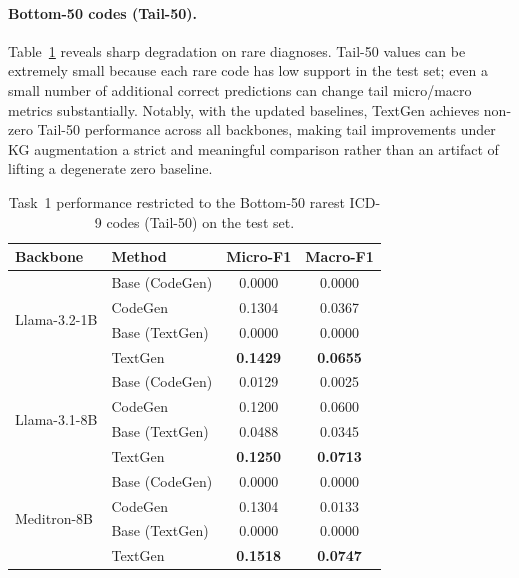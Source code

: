 \paragraph{Bottom-50 codes (Tail-50).}
Table~\ref{tab:task1-bottom50} reveals sharp degradation on rare diagnoses. Tail-50 values can be extremely small because each rare code has low support in the test set; even a small number of additional correct predictions can change tail micro/macro metrics substantially. Notably, with the updated baselines, TextGen achieves non-zero Tail-50 performance across all backbones, making tail improvements under KG augmentation a strict and meaningful comparison rather than an artifact of lifting a degenerate zero baseline.

\begin{table}[t]
\centering
\caption{Task~1 performance restricted to the Bottom-50 rarest ICD-9 codes (Tail-50) on the test set.}
\label{tab:task1-bottom50}
\begin{tabular}{llcc}
\toprule
\textbf{Backbone} & \textbf{Method} & \textbf{Micro-F1} & \textbf{Macro-F1} \\
\midrule
\multirow{4}{*}{Llama-3.2-1B}
& Base (CodeGen) & 0.0000 & 0.0000 \\
& CodeGen        & 0.1304 & 0.0367 \\
& Base (TextGen) & 0.0000 & 0.0000 \\
& TextGen        & \textbf{0.1429} & \textbf{0.0655} \\
\midrule
\multirow{4}{*}{Llama-3.1-8B}
& Base (CodeGen) & 0.0129 & 0.0025 \\
& CodeGen        & 0.1200 & 0.0600 \\
& Base (TextGen) & 0.0488 & 0.0345 \\
& TextGen        & \textbf{0.1250} & \textbf{0.0713} \\
\midrule
\multirow{4}{*}{Meditron-8B}
& Base (CodeGen) & 0.0000 & 0.0000 \\
& CodeGen        & 0.1304 & 0.0133 \\
& Base (TextGen) & 0.0000 & 0.0000 \\
& TextGen        & \textbf{0.1518} & \textbf{0.0747} \\
\bottomrule
\end{tabular}
\end{table}

